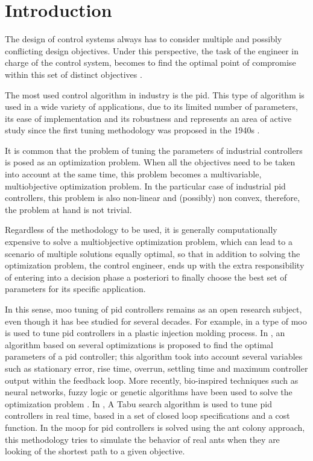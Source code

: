 \chapter{Introduction}
\label{sec:Antecedentes}
The design of control systems always has to consider multiple and possibly conflicting design objectives. Under this perspective, the task of the engineer in charge of the control system, becomes to find the optimal point of compromise within this set of distinct objectives \citep{Garpinger2012}.

The most used control algorithm in industry is the \gls{pid}. This type of algorithm is used in a wide variety of applications, due to its limited number of parameters, its ease of implementation and its robustness \citep{astromhagglund2006} and represents an area of active study since the first tuning methodology was proposed in the 1940s \citep{Ziegler1942}.

It is common that the problem of tuning the parameters of industrial controllers is posed as an optimization problem. When all the objectives need to be taken into account at the same time, this problem becomes a multivariable, multiobjective optimization problem. In the particular case of industrial \gls{pid} controllers, this problem is also non-linear and (possibly) non convex, therefore, the problem at hand is not trivial.

Regardless of the methodology to be used, it is generally computationally expensive to solve a multiobjective optimization problem, which can lead to a scenario of multiple solutions equally optimal, so that in addition to solving the optimization problem, the control engineer, ends up with the extra responsibility of entering into a decision phase a posteriori to finally choose the best set of parameters for its specific application.

In this sense, \gls{moo} tuning of \gls{pid} controllers remains as an open research subject, even though it has bee studied for several decades. For example, in \citet{Seaman1994} a type of \gls{moo} is used to tune \gls{pid} controllers in a plastic injection molding process. In \citet{Abbas1995}, an algorithm based on several optimizations is proposed to find the optimal parameters of a \gls{pid} controller; this algorithm took into account several variables such as stationary error, rise time, overrun, settling time and maximum controller output within the feedback loop. More recently, bio-inspired techniques such as neural networks, fuzzy logic or genetic algorithms have been used to solve the optimization problem \citet{Reynoso-Meza2012b}. In \citet{Bagis2011}, A Tabu search algorithm is used to tune \gls{pid} controllers in real time, based in a set of closed loop specifications and a cost function. In \citet{Chiha2012} the \gls{moop} for \gls{pid} controllers is solved using the ant colony approach, this methodology tries to simulate the behavior of real ants when they are looking of the shortest path to a given objective.

